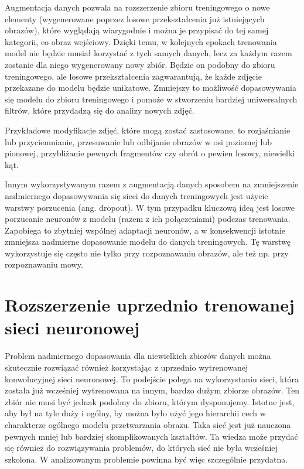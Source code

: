 Augmentacja danych pozwala na rozszerzenie zbioru treningowego o nowe elementy (wygenerowane poprzez losowe przekształcenia już istniejących obrazów), które wyglądają wiarygodnie i można je przypisać do tej samej kategorii, co obraz wejściowy. Dzięki temu, w kolejnych epokach trenowania model nie będzie musiał korzystać z tych samych danych, lecz za każdym razem zostanie dla niego wygenerowany nowy zbiór. Będzie on podobny do zbioru treningowego, ale losowe przekształcenia zagwarantują, że każde zdjęcie przekazane do modelu będzie unikatowe. Zmniejszy to możliwość dopasowywania się modelu do zbioru treningowego i pomoże 
w stworzeniu bardziej uniwersalnych filtrów, które przydadzą się do analizy nowych zdjęć.

Przykładowe modyfikacje zdjęć, które mogą zostać zastosowane, to rozjaśnianie lub przyciemnianie, przesuwanie lub odbijanie obrazów w osi poziomej lub pionowej, przybliżanie pewnych fragmentów czy obrót o pewien losowy, niewielki kąt.

Innym wykorzystywanym razem z augmentacją danych sposobem na zmniejszenie nadmiernego dopasowywania się sieci do danych treningowych jest użycie warstwy porzucenia (ang. dropout). W tym przypadku kluczową ideą jest losowe porzucanie neuronów z modelu (razem z ich połączeniami) podczas trenowania. Zapobiega to zbytniej wspólnej adaptacji neuronów, a w konsekwencji istotnie zmniejsza nadmierne dopasowanie modelu do danych treningowych.
 Tę warstwę wykorzystuje się często nie tylko przy rozpoznawaniu obrazów, ale też np. przy rozpoznawaniu mowy.


\section{Rozszerzenie uprzednio trenowanej sieci neuronowej}
Problem nadmiernego dopasowania dla niewielkich zbiorów danych można skutecznie rozwiązać również korzystając z uprzednio wytrenowanej konwolucyjnej sieci neuronowej. To podejście polega na wykorzystaniu sieci, która została już wcześniej wytrenowana na innym, bardzo dużym zbiorze obrazów. Ten zbiór nie musi być jednak podobny do zbioru, którym dysponujemy. Istotne jest, aby był na tyle duży i ogólny, by można było użyć jego hierarchii cech w charakterze ogólnego modelu przetwarzania obrazu. Taka sieć jest już nauczona pewnych mniej lub bardziej skomplikowanych kształtów. Ta wiedza może przydać się również do rozwiązywania problemów, do których sieć nie była wcześniej szkolona. W analizowanym problemie powinna być więc szczególnie przydatna.

